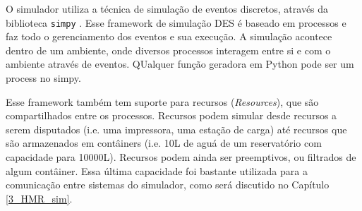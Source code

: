 O simulador utiliza a técnica de simulação de eventos discretos, através da biblioteca \texttt{simpy} \cite{simpy}. Esse framework de simulação DES é baseado em processos e faz todo o gerenciamento dos eventos e sua execução. A simulação acontece dentro de um ambiente, onde diversos processos interagem entre si e com o ambiente através de eventos. QUalquer função geradora em Python pode ser um process no simpy.

Esse framework também tem suporte para recursos (\textit{Resources}), que são compartilhados entre os processos. Recursos podem simular desde recursos a serem disputados (i.e. uma impressora, uma estação de carga) até recursos que são armazenados em contâiners (i.e. 10L de aguá de um reservatório com capacidade para 10000L). Recursos podem ainda ser preemptivos, ou filtrados de algum contâiner. Essa última capacidade foi bastante utilizada para a comunicação entre sistemas do simulador, como será discutido no Capítulo \ref{3_HMR_sim}.
